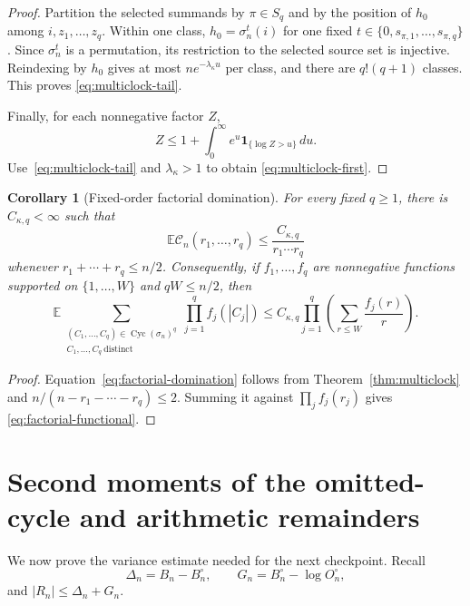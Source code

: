 \documentclass[11pt]{article}
\newtheorem{corollary}[theorem]{Corollary}
\theoremstyle{remark}
\newcommand{\Ee}{\mathbb E}
\newcommand{\one}{\mathbf 1}
\newcommand{\dd}{\,d}
\newcommand{\Cyc}{\operatorname{Cyc}}
\begin{document}
\begin{proof}
Partition the selected summands by $\pi\in S_q$ and by the position of
$h_0$ among $i,z_1,\ldots,z_q$.  Within one class,
$h_0=\sigma_n^t(i)$ for one fixed
$t\in\{0,s_{\pi,1},\ldots,s_{\pi,q}\}$.  Since $\sigma_n^t$ is a
permutation, its restriction to the selected source set is injective.
Reindexing by $h_0$ gives at most $ne^{-\lambda_\kappa u}$ per class,
and there are $q!(q+1)$ classes.  This proves
\eqref{eq:multiclock-tail}.

Finally, for each nonnegative factor $Z$,
\[
 Z\le1+\int_0^\infty e^u\one_{\{\log Z>u\}}\dd u.
\]
Use~\eqref{eq:multiclock-tail} and $\lambda_\kappa>1$ to obtain
\eqref{eq:multiclock-first}.
\end{proof}

\begin{corollary}[Fixed-order factorial domination]
\label{cor:factorial-domination}
For every fixed $q\ge1$, there is $C_{\kappa,q}<\infty$ such that
\begin{equation}
\label{eq:factorial-domination}
 \Ee\mathcal C_n(r_1,\ldots,r_q)
 \le\frac{C_{\kappa,q}}{r_1\cdots r_q}
\end{equation}
whenever $r_1+\cdots+r_q\le n/2$.
Consequently, if $f_1,\ldots,f_q$ are nonnegative functions supported on
$\{1,\ldots,W\}$ and $qW\le n/2$, then
\begin{equation}
\label{eq:factorial-functional}
 \Ee\!\sum_{\substack{(C_1,\ldots,C_q)\in\Cyc(\sigma_n)^q\\
                       C_1,\ldots,C_q\ \mathrm{distinct}}}
 \prod_{j=1}^q f_j(|C_j|)
 \le C_{\kappa,q}\prod_{j=1}^q
 \left(\sum_{r\le W}\frac{f_j(r)}r\right).
\end{equation}
\end{corollary}

\begin{proof}
Equation~\eqref{eq:factorial-domination} follows from
Theorem~\ref{thm:multiclock} and $n/(n-r_1-\cdots-r_q)\le2$.
Summing it against $\prod_jf_j(r_j)$ gives
\eqref{eq:factorial-functional}.
\end{proof}

\section{Second moments of the omitted-cycle and arithmetic remainders}
\label{sec:variance}

We now prove the variance estimate needed for the next checkpoint.  Recall
\[
 \Delta_n=B_n-B_n^\circ,
 \qquad
 G_n=B_n^\circ-\log O_n^\circ,
\]
and $|R_n|\le\Delta_n+G_n$.
\end{document}
